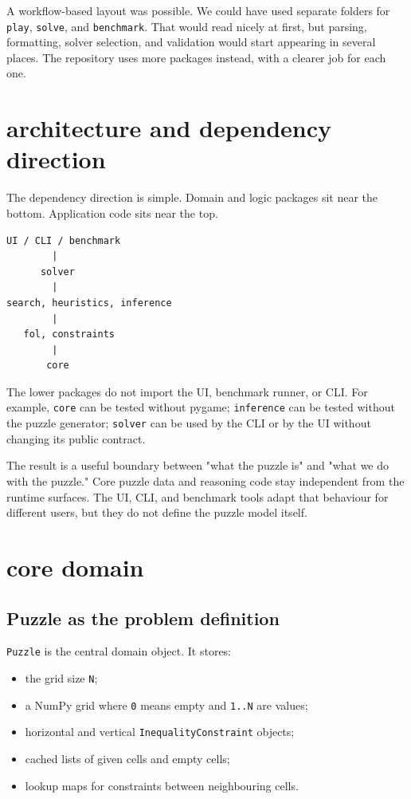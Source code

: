 \documentclass[11pt]{article}
\begin{document}
A workflow-based layout was possible. We could have used separate folders for
\texttt{play}, \texttt{solve}, and \texttt{benchmark}. That would read nicely
at first, but parsing, formatting, solver selection, and validation would start
appearing in several places. The repository uses more packages instead, with a
clearer job for each one.

\section{architecture and dependency direction}

The dependency direction is simple. Domain and logic packages sit near the
bottom. Application code sits near the top.

\begin{verbatim}
UI / CLI / benchmark
        |
      solver
        |
search, heuristics, inference
        |
   fol, constraints
        |
       core
\end{verbatim}

The lower packages do not import the UI, benchmark runner, or CLI. For example,
\texttt{core} can be tested without pygame; \texttt{inference} can be tested
without the puzzle generator; \texttt{solver} can be used by the CLI or by the
UI without changing its public contract.

The result is a useful boundary between "what the puzzle is" and "what we do
with the puzzle." Core puzzle data and reasoning code stay independent from the
runtime surfaces. The UI, CLI, and benchmark tools adapt that behaviour for
different users, but they do not define the puzzle model itself.

\section{core domain}

\subsection{Puzzle as the problem definition}

\texttt{Puzzle} is the central domain object. It stores:

\begin{itemize}
  \item the grid size \texttt{N};
  \item a NumPy grid where \texttt{0} means empty and \texttt{1..N} are values;
  \item horizontal and vertical \texttt{InequalityConstraint} objects;
  \item cached lists of given cells and empty cells;
  \item lookup maps for constraints between neighbouring cells.
\end{itemize}
\end{document}
